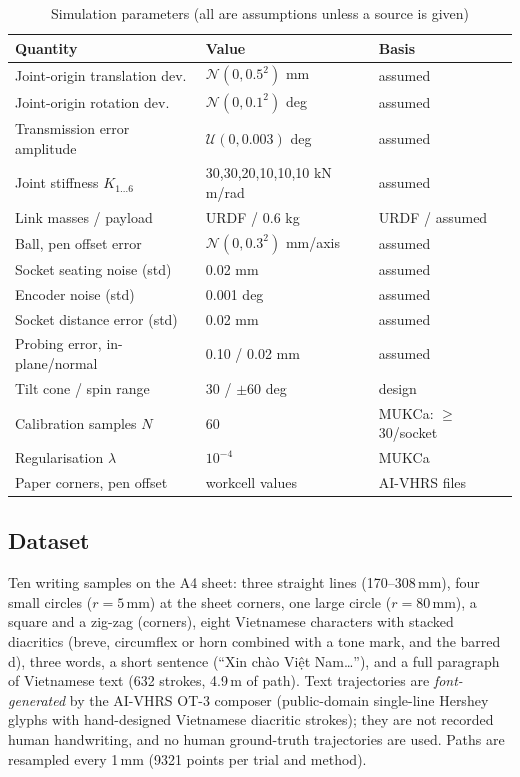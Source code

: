 \documentclass[conference]{IEEEtran}
\begin{document}
\begin{table}[t]
\caption{Simulation parameters (all are assumptions unless a source is given)}\label{tab:sim}
\centering\scriptsize
\setlength{\tabcolsep}{3pt}
\begin{tabular}{@{}lll@{}}
\toprule
Quantity & Value & Basis\\
\midrule
Joint-origin translation dev. & $\mathcal N(0,0.5^2)$ mm & assumed\\
Joint-origin rotation dev. & $\mathcal N(0,0.1^2)$ deg & assumed\\
Transmission error amplitude & $\mathcal U(0,0.003)$ deg & assumed\\
Joint stiffness $K_{1\ldots6}$ & 30,30,20,10,10,10 kN\,m/rad & assumed\\
Link masses / payload & URDF / 0.6 kg & URDF / assumed\\
Ball, pen offset error & $\mathcal N(0,0.3^2)$ mm/axis & assumed\\
Socket seating noise (std) & 0.02 mm & assumed\\
Encoder noise (std) & 0.001 deg & assumed\\
Socket distance error (std) & 0.02 mm & assumed\\
Probing error, in-plane/normal & 0.10 / 0.02 mm & assumed\\
Tilt cone / spin range & 30 / $\pm$60 deg & design\\
Calibration samples $N$ & 60 & MUKCa: $\geq$30/socket\\
Regularisation $\lambda$ & $10^{-4}$ & MUKCa\\
Paper corners, pen offset & workcell values & AI-VHRS files\\
\bottomrule
\end{tabular}
\end{table}

\subsection{Dataset}
Ten writing samples on the A4 sheet: three straight lines (170--308\,mm), four small circles ($r=5$\,mm) at the sheet
corners, one large circle ($r=80$\,mm), a square and a zig-zag (corners), eight Vietnamese characters with stacked diacritics (breve, circumflex or horn
combined with a tone mark, and the barred d), three words, a short sentence (``Xin ch\`ao Vi\d{\^e}t Nam\ldots''),
and a full paragraph of Vietnamese text (632 strokes, 4.9\,m of path). Text trajectories are \emph{font-generated} by the
AI-VHRS OT-3 composer (public-domain single-line Hershey glyphs with hand-designed Vietnamese diacritic strokes); they are not
recorded human handwriting, and no human ground-truth trajectories are used. Paths are resampled every 1\,mm (9321 points per
trial and method).
\end{document}
